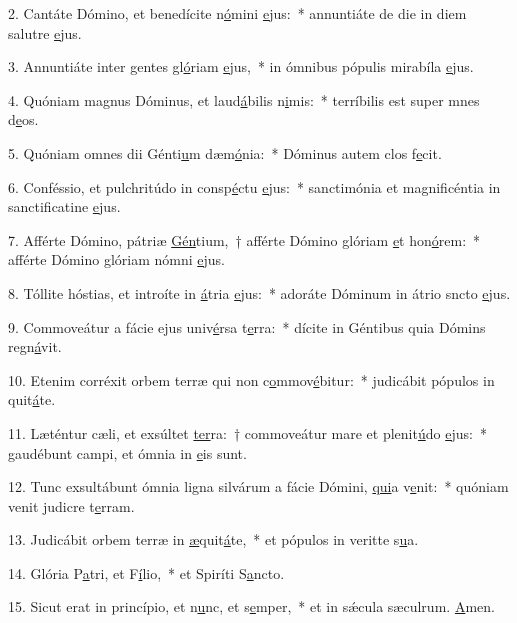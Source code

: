 2. Cantáte Dómino, et benedícite n\uline{ó}mini \uline{e}jus:~* annuntiáte de die in diem salutre \uline{e}jus.\par 
3. Annuntiáte inter gentes gl\uline{ó}riam \uline{e}jus,~* in ómnibus pópulis mirabíla \uline{e}jus.\par 
4. Quóniam magnus Dóminus, et laud\uline{á}bilis n\uline{i}mis:~* terríbilis est super mnes d\uline{e}os.\par 
5. Quóniam omnes dii Génti\uline{u}m dæm\uline{ó}nia:~* Dóminus autem clos f\uline{e}cit.\par 
6. Conféssio, et pulchritúdo in consp\uline{é}ctu \uline{e}jus:~* sanctimónia et magnificéntia in sanctificatine \uline{e}jus.\par 
7. Afférte Dómino, pátriæ \uline{Gén}tium,~† afférte Dómino glóriam \uline{e}t hon\uline{ó}rem:~* afférte Dómino glóriam nómni \uline{e}jus.\par 
8. Tóllite hóstias, et introíte in \uline{á}tria \uline{e}jus:~* adoráte Dóminum in átrio sncto \uline{e}jus.\par 
9. Commoveátur a fácie ejus univ\uline{é}rsa t\uline{e}rra:~* dícite in Géntibus quia Dómins regn\uline{á}vit.\par 
10. Etenim corréxit orbem terræ qui non c\uline{o}mmov\uline{é}bitur:~* judicábit pópulos in quit\uline{á}te.\par 
11. Læténtur cæli, et exsúltet \uline{ter}ra:~† commoveátur mare et plenit\uline{ú}do \uline{e}jus:~* gaudébunt campi, et ómnia  in \uline{e}is sunt.\par 
12. Tunc exsultábunt ómnia ligna silvárum a fácie Dómini, \uline{qui}a v\uline{e}nit:~* quóniam venit judicre t\uline{e}rram.\par 
13. Judicábit orbem terræ in \uline{æ}quit\uline{á}te,~* et pópulos in veritte s\uline{u}a.\par 
14. Glória P\uline{a}tri, et F\uline{í}lio,~* et Spiríti S\uline{a}ncto.\par 
15. Sicut erat in princípio, et n\uline{u}nc, et s\uline{e}mper,~* et in sǽcula sæculrum. \uline{A}men.\par 
